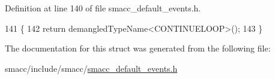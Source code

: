 Definition at line 140 of file smacc\+\_\+default\+\_\+events.\+h.


\begin{DoxyCode}
141   \{
142     \textcolor{keywordflow}{return} demangledTypeName<CONTINUELOOP>();
143   \}
\end{DoxyCode}


The documentation for this struct was generated from the following file\+:\begin{DoxyCompactItemize}
\item 
smacc/include/smacc/\hyperlink{smacc__default__events_8h}{smacc\+\_\+default\+\_\+events.\+h}\end{DoxyCompactItemize}
